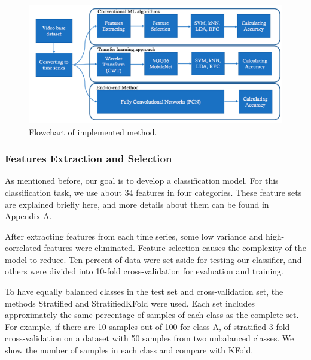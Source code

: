 \begin{center}
	\begin{figure}[!t]
    	\centering
        \begin{minipage}[b]{\textwidth}
            \includegraphics[width=\textwidth]{manuscript/src/figures/project/flowchart.png}
        \end{minipage}
        \hspace{-1em}
        \caption{Flowchart of implemented method.}
        \label{fig:flow}
	\end{figure}
\end{center}

\subsubsection{Features Extraction and Selection}

As mentioned before, our goal is to develop a classification model. For this classification task, we use about $34$ features in four categories. These feature sets are explained briefly here, and more details about them can be found in Appendix A.

After extracting features from each time series, some low variance and high-correlated features were eliminated. Feature selection causes the complexity of the model to reduce. Ten percent of data were set aside for testing our classifier, and others were divided into 10-fold cross-validation for evaluation and training. 

To have equally balanced classes in the test set and cross-validation set, the methods Stratified and StratifiedKFold were used. Each set includes approximately the same percentage of samples of each class as the complete set. For example, if there are 10 samples out of 100 for class A, of stratified 3-fold cross-validation on a dataset with 50 samples from two unbalanced classes. We show the number of samples in each class and compare with KFold.%


